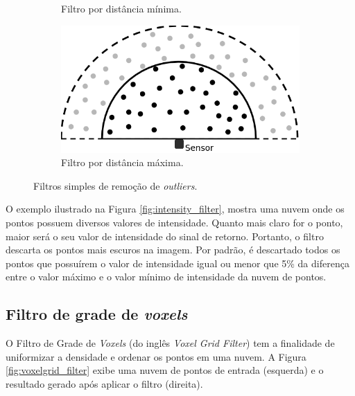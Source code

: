 \begin{figure}[H]
\begin{subfigure}[t]{0.4\textwidth}
        \caption{Filtro por distância mínima.}
        \label{fig:distance_filter}
    \end{subfigure}
    \hspace{3em}
    \begin{subfigure}[t]{0.4\textwidth}
        \includegraphics[width=\textwidth]{dados/figuras/distance_filter2.png}
        \caption{Filtro por distância máxima.}
        \label{fig:distance_filter2}
    \end{subfigure}
    \caption{Filtros simples de remoção de \textit{outliers}.}
\end{figure}

O exemplo ilustrado na Figura \ref{fig:intensity_filter}, mostra uma nuvem onde os pontos possuem diversos valores de intensidade. 
Quanto mais claro for o ponto, maior será o seu valor de intensidade do sinal de retorno. 
Portanto, o filtro descarta os pontos mais escuros na imagem.
Por padrão, é descartado todos os pontos que possuírem o valor de intensidade igual ou menor que 5\% da diferença entre o valor máximo e o valor mínimo de intensidade da nuvem de pontos.

\subsection{Filtro de grade de \textit{voxels}}
\label{sec:voxelgrid_filter}

O Filtro de Grade de \textit{Voxels} (do inglês \textit{Voxel Grid Filter}) tem a finalidade de uniformizar a densidade e ordenar os pontos em uma nuvem. 
A Figura \ref{fig:voxelgrid_filter} exibe uma nuvem de pontos de entrada (esquerda) e o resultado gerado após aplicar o filtro (direita).

